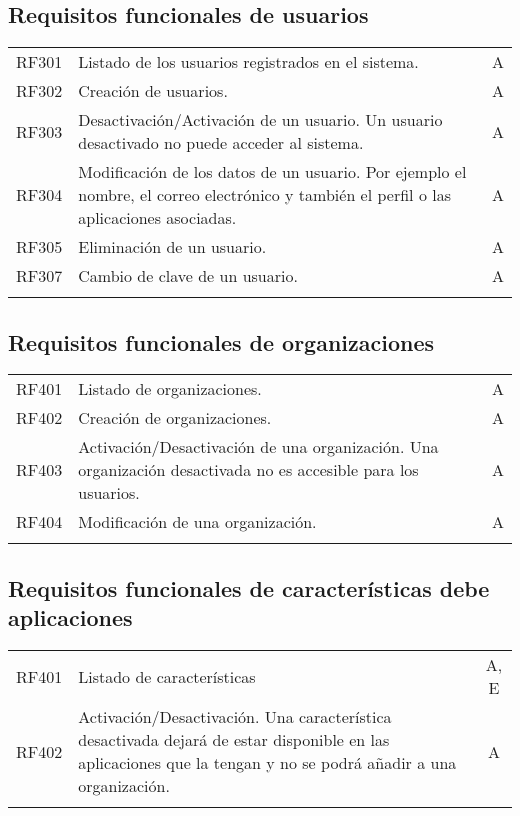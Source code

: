 \subsection{Requisitos funcionales de usuarios}
\begin{longtable}{lp{13cm}c}
  RF301\label{RF301} & Listado de los usuarios registrados en el sistema. & A \\
  RF302\label{RF302} & Creación de usuarios. & A \\
  RF303\label{RF303} & Desactivación/Activación de un usuario. Un usuario desactivado no puede acceder al sistema. & A \\
  RF304\label{RF304} & Modificación de los datos de un usuario. Por ejemplo el nombre, el correo electrónico y también el perfil o las aplicaciones asociadas. & A \\
  RF305\label{RF305} & Eliminación de un usuario. & A \\
  RF307\label{RF307} & Cambio de clave de un usuario. & A \\
  \label{cuadro:requisitos-funcionales-de-usuarios}
\end{longtable}

\subsection{Requisitos funcionales de organizaciones}
\begin{longtable}{lp{13cm}c}
  RF401\label{RF401} & Listado de organizaciones. & A \\
  RF402\label{RF402} & Creación de organizaciones. & A \\
  RF403\label{RF403} & Activación/Desactivación de una organización. Una organización desactivada no es accesible para los usuarios. & A \\
  RF404\label{RF404} & Modificación de una organización. & A \\
  \label{cuadro:requisitos-funcionales-de-organizaciones}
\end{longtable}

\subsection{Requisitos funcionales de características debe aplicaciones}
\begin{longtable}{lp{13cm}c}
  RF401\label{RF401} & Listado de características & A, E \\
  RF402\label{RF402} & Activación/Desactivación. Una característica desactivada dejará de estar disponible en las aplicaciones que la tengan y no se podrá añadir a una organización. & A \\
  \label{cuadro:requisitos-funcionales-de-aplicaciones}
\end{longtable}

